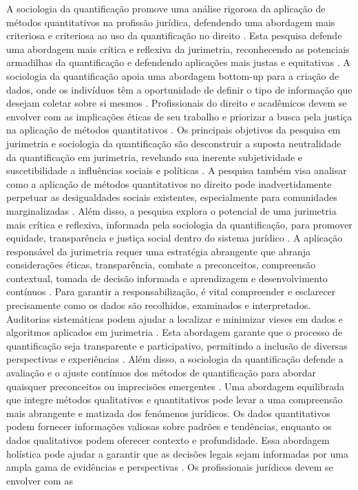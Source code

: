 A sociologia da quantificação promove uma análise rigorosa da aplicação de métodos quantitativos na profissão jurídica, defendendo uma abordagem mais criteriosa e criteriosa ao uso da quantificação no direito \cite{10.1007/s11186-021-09453-1,salais2016quantificação}. Esta pesquisa defende uma abordagem mais crítica e reflexiva da jurimetria, reconhecendo as potenciais armadilhas da quantificação e defendendo aplicações mais justas e equitativas \cite{10.1590/dados.2022.65.3.267}. A sociologia da quantificação apoia uma abordagem bottom-up para a criação de dados, onde os indivíduos têm a oportunidade de definir o tipo de informação que desejam coletar sobre si mesmos \cite{10.1590/dados.2022.65.3.267}. Profissionais do direito e acadêmicos devem se envolver com as implicações éticas de seu trabalho e priorizar a busca pela justiça na aplicação de métodos quantitativos \cite{10.1007/s11186-021-09453-1,10.3390/fi9040068}. Os principais objetivos da pesquisa em jurimetria e sociologia da quantificação são desconstruir a suposta neutralidade da quantificação em jurimetria, revelando sua inerente subjetividade e suscetibilidade a influências sociais e políticas \cite{10.1007/s11186-021-09453-1,10.3390/ fi9040068}. A pesquisa também visa analisar como a aplicação de métodos quantitativos no direito pode inadvertidamente perpetuar as desigualdades sociais existentes, especialmente para comunidades marginalizadas \cite{10.1007/s11186-021-09453-1,10.3390/fi9040068}. Além disso, a pesquisa explora o potencial de uma jurimetria mais crítica e reflexiva, informada pela sociologia da quantificação, para promover equidade, transparência e justiça social dentro do sistema jurídico \cite{10.1007/s11186-021-09453-1,10.3390/ fi9040068}. A aplicação responsável da jurimetria requer uma estratégia abrangente que abranja considerações éticas, transparência, combate a preconceitos, compreensão contextual, tomada de decisão informada e aprendizagem e desenvolvimento contínuos \cite{10.1590/dados.2022.65.3.267,inthelawviewmetadatacitationsimilarpapers2014}. Para garantir a responsabilização, é vital compreender e esclarecer precisamente como os dados são recolhidos, examinados e interpretados. Auditorias sistemáticas podem ajudar a localizar e minimizar vieses em dados e algoritmos aplicados em jurimetria \cite{10.1590/dados.2022.65.3.267,inthelawviewmetadatacitationsimilarpapers2014}. Esta abordagem garante que o processo de quantificação seja transparente e participativo, permitindo a inclusão de diversas perspectivas e experiências \cite{salais2016}. Além disso, a sociologia da quantificação defende a avaliação e o ajuste contínuos dos métodos de quantificação para abordar quaisquer preconceitos ou imprecisões emergentes \cite{salais2016}. Uma abordagem equilibrada que integre métodos qualitativos e quantitativos pode levar a uma compreensão mais abrangente e matizada dos fenómenos jurídicos. Os dados quantitativos podem fornecer informações valiosas sobre padrões e tendências, enquanto os dados qualitativos podem oferecer contexto e profundidade. Essa abordagem holística pode ajudar a garantir que as decisões legais sejam informadas por uma ampla gama de evidências e perspectivas \cite{10.1590/dados.2022.65.3.267,10.1057/s41599-020-00557-0}. Os profissionais jurídicos devem se envolver com as 